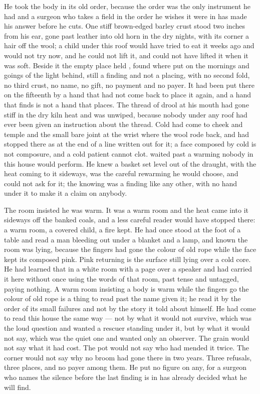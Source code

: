 He took the body in its old order, because the order was the only instrument he had and a surgeon who takes a field in the order he wishes it were in has made his answer before he cuts. One stiff brown-edged barley crust stood two inches from his ear, gone past leather into old horn in the dry nights, with its corner a hair off the wool; a child under this roof would have tried to eat it weeks ago and would not try now, and he could not lift it, and could not have lifted it when it was soft. Beside it the empty place held , found where put on the mornings and goings of the light behind, still a finding and not a placing, with no second fold, no third crust, no name, no gift, no payment and no payer. It had been put there on the fifteenth by a hand that had not come back to place it again, and a hand that finds is not a hand that places. The thread of drool at his mouth had gone stiff in the dry kiln heat and was unwiped, because nobody under any roof had ever been given an instruction about the thread. Cold had come to cheek and temple and the small bare joint at the wrist where the wool rode back, and had stopped there as at the end of a line written out for it; a face composed by cold is not composure, and a cold patient cannot clot.  waited past a warming nobody in this house would perform. He knew a basket set level out of the draught, with the heat coming to it sideways, was the careful rewarming he would choose, and could not ask for it; the knowing was a finding like any other, with no hand under it to make it a claim on anybody.

The room insisted he was warm. It was a warm room and the heat came into it sideways off the banked coals, and a less careful reader would have stopped there: a warm room, a covered child, a fire kept. He had once stood at the foot of a table and read a man bleeding out under a blanket and a lamp, and known the room was lying, because the fingers had gone the colour of old rope while the face kept its composed pink. Pink returning is the surface still lying over a cold core. He had learned that in a white room with a page over a speaker and had carried it here without once using the words of that room, past tense and untagged, paying nothing. A warm room insisting a body is warm while the fingers go the colour of old rope is a thing to read past the name given it; he read it by the order of its small failures and not by the story it told about himself. He had come to read this house the same way --- not by what it would not survive, which was the loud question and wanted a rescuer standing under it, but by what it would not say, which was the quiet one and wanted only an observer. The grain would not say what it had cost. The pot would not say who had mended it twice. The corner would not say why no broom had gone there in two years. Three refusals, three places, and no payer among them. He put no figure on any, for a surgeon who names the silence before the last finding is in has already decided what he will find.

